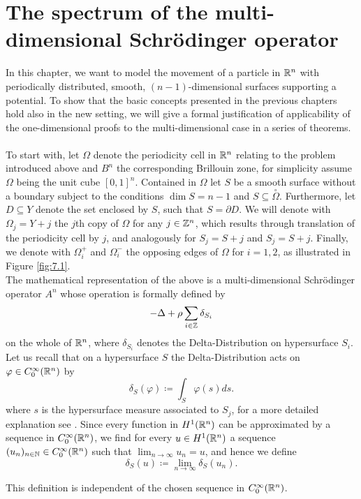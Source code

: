 \chapter{The spectrum of the multi-dimensional Schrödinger operator}  \label{chap:7} 

In this chapter, we want to model the movement of a particle in $\mathbb{R}^{n}$ with periodically distributed, smooth, $(n-1)$-dimensional surfaces supporting a potential. To show that the basic concepts presented in the previous chapters hold also in the new setting, we will give a formal justification of applicability of the one-dimensional proofs to the multi-dimensional case in a series of theorems.
~\\

To start with, let $\Omega$ denote the periodicity cell in $\mathbb{R}^{n}$ relating to the problem introduced above and $B^{n}$ the corresponding Brillouin zone, for simplicity assume $\Omega$ being the unit cube $[0, 1]^{n}$. Contained in $\Omega$ let $S$ be a smooth surface without a boundary subject to the conditions $\dim S = n - 1$ and $S \subseteq \overset{\circ}{\Omega}$. Furthermore, let $D \subseteq Y$ denote the set enclosed by $S$, such that $S = \partial D$. We will denote with $\Omega_{j} = Y + j$ the $j$th copy of $\Omega$ for any $j \in \mathbb{Z}^{n}$, which results through translation of the periodicity cell by $j$, and analogously for $S_{j} = S + j$ and $S_{j} = S + j$. Finally, we denote with $\Omega_{i}^{+}$ and $\Omega_{i}^{-}$ the opposing edges of $\Omega$ for $i = 1, 2$, as illustrated in Figure \ref{fig:7.1}.
~\\

The mathematical representation of the above is a multi-dimensional Schrödinger operator $A^{n}$ whose operation is formally defined by
\begin{equation}
	- \Delta + \rho \sum_{i \in \mathbb{Z}} \delta_{S_{i}} \label{eq:7.1-md_the_operator_A_formallyy}
\end{equation}
on the whole of $\mathbb{R}^{n}$, where $\delta_{S_{i}}$ denotes the Delta-Distribution on hypersurface $S_{i}$. Let us recall that on a hypersurface $S$ the Delta-Distribution acts on $\varphi \in C_{0}^{\infty}(\mathbb{R}^{n})$ by 
	\[ \delta_{S}\left(\varphi\right) \coloneqq \int_{S} \varphi(s) ds . \]
where $s$ is the hypersurface measure associated to $S_{j}$, for a more detailed explanation see \cite[Chapter 14]{forster2012analysis}. Since every function in $H^{1}(\mathbb{R}^{n})$ can be approximated by a sequence in $C_{0}^{\infty}(\mathbb{R}^{n})$, we find for every $u \in H^{1}(\mathbb{R}^{n})$ a sequence $(u_{n})_{n \in \mathbb{N}} \in C_{0}^{\infty}(\mathbb{R}^{n})$ such that $\lim_{n \rightarrow \infty} u_{n} = u$, and hence we define
	\[ \delta_{S}\left(u\right) \coloneqq \lim_{n \rightarrow \infty} \delta_{S}\left(u_{n}\right) . \]
\begin{remark}
	This definition is independent of the chosen sequence in $C_{0}^{\infty}(\mathbb{R}^{n})$.
\end{remark}

